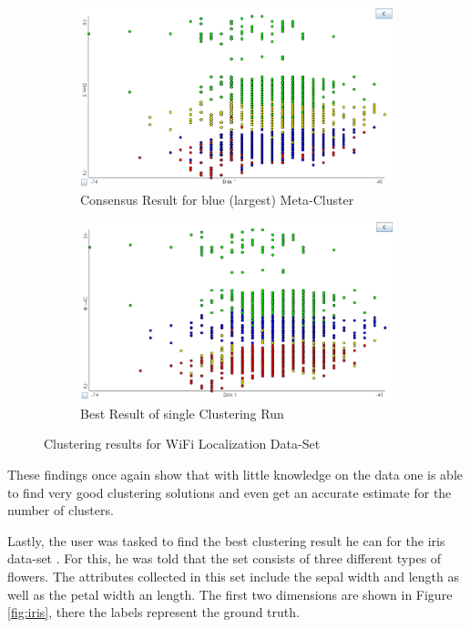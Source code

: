 \documentclass[
	a4paper,
	english,
	twoside,
	openright,               
	11pt                            
	]{report}
\begin{document}
\begin{figure}[h]
\centering
\begin{subfigure}[t]{.49\textwidth}
  \centering
  \includegraphics[width=.95\linewidth]{user_wifi_consensus}
  \caption{Consensus Result for blue (largest) Meta-Cluster}
  \label{fig:user_wifi_consensus}
\end{subfigure}
\hfill
\begin{subfigure}[t]{.49\textwidth}
  \centering
  \includegraphics[width=.95\linewidth]{user_wifi_best}
  \caption{Best Result of single Clustering Run}
  \label{fig:user_wifi_best}
\end{subfigure}

\caption{Clustering results for WiFi Localization Data-Set}
\label{fig:user_wifi}
\end{figure}

These findings once again show that with little knowledge on the data one is able to find very good clustering solutions and even get an accurate estimate for the number of clusters.

Lastly, the user was tasked to find the best clustering result he can for the iris data-set \cite{Dua:2019}. For this, he was told that the set consists of three different types of flowers. The attributes collected in this set include the sepal width and length as well as the petal width an length. The first two dimensions are shown in Figure \ref{fig:iris}, there the labels represent the ground truth.
\end{document}
